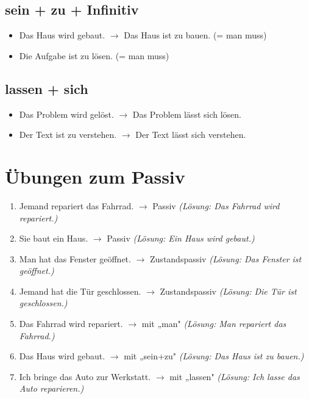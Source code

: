 \subsection{sein + zu + Infinitiv}
\begin{itemize}
    \item Das Haus wird gebaut. $\rightarrow$ Das Haus ist zu bauen. (= man muss)
    \item Die Aufgabe ist zu lösen. (= man muss)
\end{itemize}

\subsection{lassen + sich}
\begin{itemize}
    \item Das Problem wird gelöst. $\rightarrow$ Das Problem lässt sich lösen.
    \item Der Text ist zu verstehen. $\rightarrow$ Der Text lässt sich verstehen.
\end{itemize}

\section{Übungen zum Passiv}
\label{sec:PassivUebungen}

\begin{enumerate}
    \item Jemand repariert das Fahrrad. $\rightarrow$ Passiv \quad \textit{(Lösung: Das Fahrrad wird repariert.)}
    \item Sie baut ein Haus. $\rightarrow$ Passiv \quad \textit{(Lösung: Ein Haus wird gebaut.)}
    \item Man hat das Fenster geöffnet. $\rightarrow$ Zustandspassiv \quad \textit{(Lösung: Das Fenster ist geöffnet.)}
    \item Jemand hat die Tür geschlossen. $\rightarrow$ Zustandspassiv \quad \textit{(Lösung: Die Tür ist geschlossen.)}
    \item Das Fahrrad wird repariert. $\rightarrow$ mit „man" \quad \textit{(Lösung: Man repariert das Fahrrad.)}
    \item Das Haus wird gebaut. $\rightarrow$ mit „sein+zu" \quad \textit{(Lösung: Das Haus ist zu bauen.)}
    \item Ich bringe das Auto zur Werkstatt. $\rightarrow$ mit „lassen" \quad \textit{(Lösung: Ich lasse das Auto reparieren.)}
\end{enumerate}

\chapterend